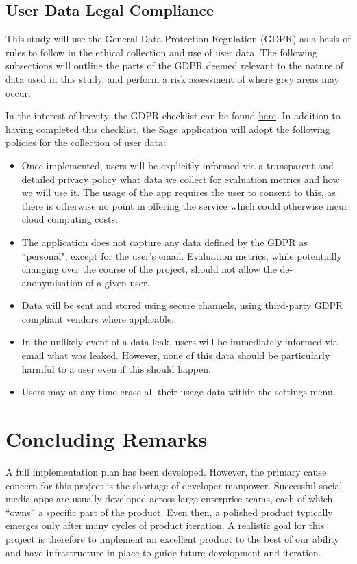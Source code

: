 \subsection{User Data Legal Compliance}
This study will use the General Data Protection Regulation (GDPR) as a basis of rules to follow in the ethical collection and use of user data. The following subsections will outline the parts of the GDPR deemed relevant to the nature of data used in this study, and perform a risk assessment of where grey areas may occur.

In the interest of brevity, the GDPR checklist can be found \href{https://gdpr.eu/checklist/}{here}. In addition to having completed this checklist, the Sage application will adopt the following policies for the collection of user data:

\begin{itemize}
    \item Once implemented, users will be explicitly informed via a transparent and detailed privacy policy what data we collect for evaluation metrics and how we will use it. The usage of the app requires the user to consent to this, as there is otherwise no point in offering the service which could otherwise incur cloud computing costs.
    \item The application does not capture any data defined by the GDPR as ``personal", except for the user's email. Evaluation metrics, while potentially changing over the course of the project, should not allow the de-anonymisation of a given user.
    \item Data will be sent and stored using secure channels, using third-party GDPR compliant vendors where applicable.
    \item In the unlikely event of a data leak, users will be immediately informed via email what was leaked. However, none of this data should be particularly harmful to a user even if this should happen.
    \item Users may at any time erase all their usage data within the settings menu.
\end{itemize}

\section{Concluding Remarks}
A full implementation plan has been developed. However, the primary cause concern for this project is the shortage of developer manpower. Successful social media apps are usually developed across large enterprise teams, each of which ``owns'' a specific part of the product. Even then, a polished product typically emerges only after many cycles of product iteration. A realistic goal for this project is therefore to implement an excellent product to the best of our ability and have infrastructure in place to guide future development and iteration.
